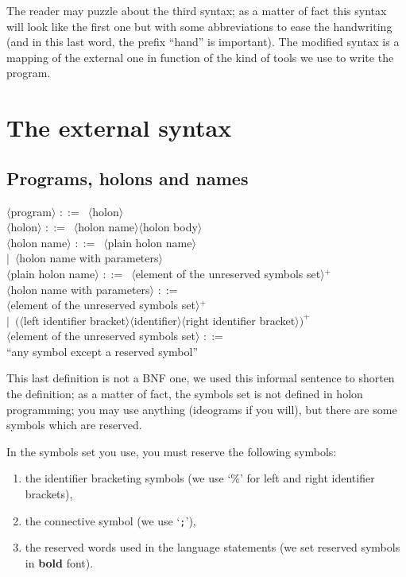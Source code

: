 \documentclass[openany,nobib]{tufte-book}
\newcommand{\sym}[1]{$\langle$#1$\rangle$}
\def\is{$::=$\ }
\def\alt{$|$\ }
\begin{document}
\noindent The reader may puzzle about the third syntax; as a matter of fact
this syntax will look like the first one but with some abbreviations to ease
the handwriting (and in this last word, the prefix ``hand'' is important). The
modified syntax is a mapping of the external one in function of the kind of
tools we use to write the program.

\section{The external syntax}

\subsection{Programs, holons and names}

\begin{tcolorbox}
\sym{program} \is \sym{holon}\\
\sym{holon} \is \sym{holon name}\sym{holon body}\\
\sym{holon name} \is \sym{plain holon name}\\
    \qquad \alt \sym{holon name with parameters}\\
\sym{plain holon name} \is \sym{element of the unreserved symbols set}$^+$\\
\sym{holon name with parameters} \is\\
\qquad\sym{element of the unreserved symbols set}$^+$\\
\qquad\alt$($\sym{left identifier bracket}\sym{identifier}\sym{right identifier
bracket}$)^+$\\
\sym{element of the unreserved symbols set} \is\\
\qquad``any symbol except a reserved symbol''
\end{tcolorbox}

This last definition is not a BNF one, we used this informal sentence to
shorten the definition; as a matter of fact, the symbols set is not defined in
holon programming; you may use anything (ideograms if you will), but there are
some symbols which are reserved.

In the symbols set you use, you must reserve the following symbols:
\begin{enumerate}
    \item the identifier bracketing symbols (we use `\%' for left and right
identifier brackets),
    \item the connective symbol (we use `{\tt;}'),
    \item the reserved words used in the language statements (we set reserved
symbols in {\bf bold} font).
\end{enumerate}
\end{document}
